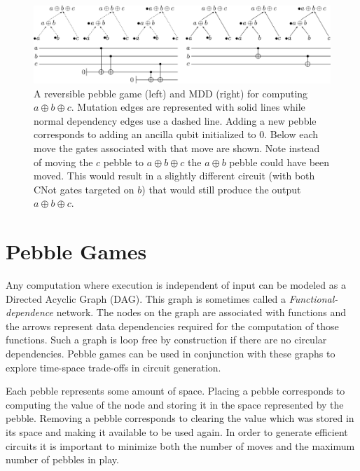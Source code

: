 \begin{figure} \centering
    \includegraphics[width=\textwidth]{images/pebble-to-circ}

    \caption{A reversible pebble game (left) and MDD (right) for computing $a
        \oplus b \oplus c$. Mutation edges are represented with solid lines
        while normal dependency edges use a dashed line. Adding a new pebble
        corresponds to adding an ancilla qubit initialized to 0. Below each
        move the gates associated with that move are shown. Note instead of
        moving the $c$ pebble to $a\oplus b \oplus c$ the $a \oplus b$ pebble
        could have been moved.  This would result in a slightly different
        circuit (with both CNot gates targeted on $b$) that would still produce
    the output $a \oplus b \oplus c$. }

    \label{fig:mddExample}
\end{figure}

\section{Pebble Games\label{sec:pebble}}

Any computation where execution is independent of input can be modeled as a
Directed Acyclic Graph (DAG). This graph is sometimes called a
\emph{Functional-dependence} network. The nodes on the graph are associated
with functions and the arrows represent data dependencies required for the
computation of those functions. Such a graph is loop free by construction if
there are no circular dependencies\footnotemark. Pebble games can be used in
conjunction with these graphs to explore time-space trade-offs in circuit
generation.


Each pebble represents some amount of space\footnotemark. Placing a pebble corresponds to
computing the value of the node and storing it in the space represented by the
pebble. Removing a pebble corresponds to clearing the value which was stored in
its space and making it available to be used again. In order to generate
efficient circuits it is important to minimize both the number of moves
and the maximum number of pebbles in play.

